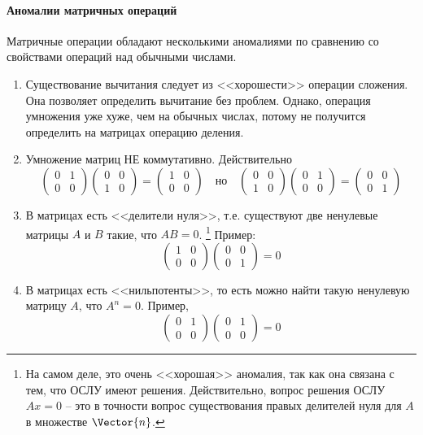 \paragraph{Аномалии матричных операций}
Матричные операции обладают несколькими аномалиями по сравнению со свойствами операций над обычными числами.
\begin{enumerate}
\item Существование вычитания следует из <<хорошести>> операции сложения.
Она позволяет определить вычитание без проблем.
Однако, операция умножения уже хуже, чем на обычных числах, потому не получится определить на матрицах операцию деления.


\item Умножение матриц НЕ коммутативно.
Действительно 
\[
\begin{pmatrix}
{0}&{1}\\
{0}&{0}
\end{pmatrix}
\begin{pmatrix}
{0}&{0}\\
{1}&{0}
\end{pmatrix}
=
\begin{pmatrix}
{1}&{0}\\
{0}&{0}
\end{pmatrix}\quad\text{но}\quad
\begin{pmatrix}
{0}&{0}\\
{1}&{0}
\end{pmatrix}
\begin{pmatrix}
{0}&{1}\\
{0}&{0}
\end{pmatrix}
=\begin{pmatrix}
{0}&{0}\\
{0}&{1}
\end{pmatrix}
\]
\item В матрицах есть <<делители нуля>>, т.е. существуют две ненулевые матрицы $A$ и $B$ такие, что $AB = 0$.%
\footnote{На самом деле, это очень <<хорошая>> аномалия, так как она связана с тем, что ОСЛУ имеют решения.
Действительно, вопрос решения ОСЛУ $Ax = 0$ -- это в точности вопрос существования правых делителей нуля для $A$ в множестве $\Vector{n}$.}
Пример:
\[
\begin{pmatrix}
{1}&{0}\\
{0}&{0}
\end{pmatrix}
\begin{pmatrix}
{0}&{0}\\
{0}&{1}
\end{pmatrix}
=0
\]
\item В матрицах есть <<нильпотенты>>, то есть можно найти такую ненулевую матрицу $A$, что $A^n=0$.
Пример, 
\[
\begin{pmatrix}
{0}&{1}\\
{0}&{0}
\end{pmatrix}
\begin{pmatrix}
{0}&{1}\\
{0}&{0}
\end{pmatrix}
=0
\]
\end{enumerate}

